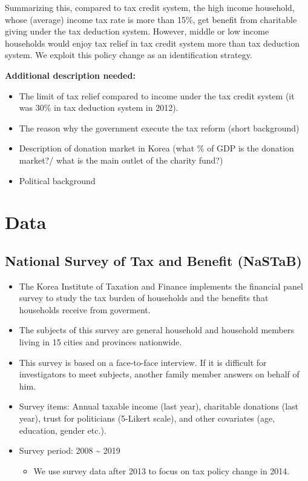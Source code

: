 \documentclass[ review  , 3p ]{elsarticle}
\providecommand{\tightlist}{%
  \setlength{\itemsep}{0pt}\setlength{\parskip}{0pt}}
\begin{document}
  Summarizing this, compared to tax credit system, the high income household, whose (average) income tax rate is more than 15\%, get benefit from charitable giving under the tax deduction system. However, middle or low income households would enjoy tax relief in tax credit system more than tax deduction system. We exploit this policy change as an identification strategy.
  
  \textbf{Additional description needed:}
  
  \begin{itemize}
  \tightlist
  \item
    The limit of tax relief compared to income under the tax credit system (it was 30\% in tax deduction system in 2012).
  \item
    The reason why the government execute the tax reform (short background)
  \item
    Description of donation market in Korea (what \% of GDP is the donation market?/ what is the main outlet of the charity fund?)
  \item
    Political background
  \end{itemize}
  
  \hypertarget{data}{%
  \section{Data}\label{data}}
  
  \hypertarget{national-survey-of-tax-and-benefit-nastab}{%
  \subsection{National Survey of Tax and Benefit (NaSTaB)}\label{national-survey-of-tax-and-benefit-nastab}}
  
  \begin{itemize}
  \tightlist
  \item
    The Korea Institute of Taxation and Finance implements the financial panel survey to study the tax burden of households and the benefits that households receive from goverment.
  \item
    The subjects of this survey are general household and household members living in 15 cities and provinces nationwide.
  \item
    This survey is based on a face-to-face interview. If it is difficult for investigators to meet subjects, another family member answers on behalf of him.
  \item
    Survey items: Annual taxable income (last year), charitable donations (last year), trust for politicians (5-Likert scale), and other covariates (age, education, gender etc.).
  \item
    Survey period: 2008 \textasciitilde{} 2019
  
    \begin{itemize}
    \tightlist
    \item
      We use survey data after 2013 to focus on tax policy change in 2014.
    \end{itemize}
  \end{itemize}
  
\end{document}
